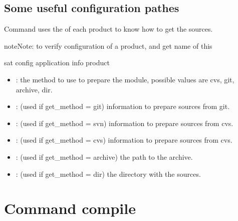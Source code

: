 \documentclass[a4paper,10pt,english]{sphinxmanual}
\begin{document}
\subsection{Some useful configuration pathes}
\label{\detokenize{commands/prepare:some-useful-configuration-pathes}}
Command  uses the  of each product to know how to get the sources.

\begin{sphinxadmonition}{note}{Note:}
to verify configuration of a product, and get name of this 

%
\begin{sphinxVerbatim}[commandchars=\\\{\}]
sat config \PYGZlt{}application\PYGZgt{} \PYGZhy{}\PYGZhy{}info \PYGZlt{}product\PYGZgt{}
\end{sphinxVerbatim}
\end{sphinxadmonition}
\begin{itemize}
\item {} 
: the method to use to prepare the module, possible values are cvs, git, archive, dir.

\item {} 
 : (used if get\_method = git) information to prepare sources from git.

\item {} 
 : (used if get\_method = svn) information to prepare sources from cvs.

\item {} 
 : (used if get\_method = cvs) information to prepare sources from cvs.

\item {} 
 : (used if get\_method = archive) the path to the archive.

\item {} 
 : (used if get\_method = dir) the directory with the sources.

\end{itemize}

\clearpage


\section{Command compile}
\label{\detokenize{commands/compile:svn}}\label{\detokenize{commands/compile:command-compile}}\label{\detokenize{commands/compile::doc}}
\end{document}
